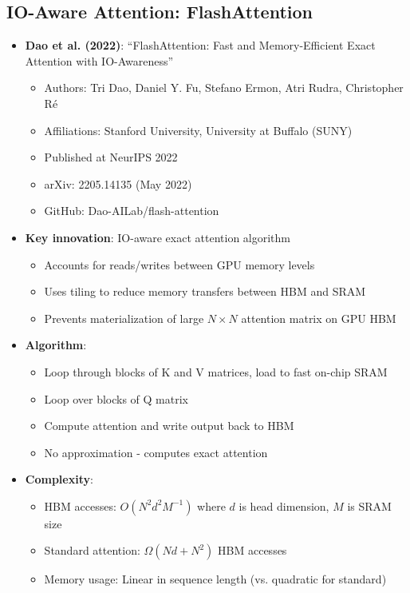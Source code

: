 \documentclass[11pt,letterpaper]{article}
\begin{document}
\subsection{IO-Aware Attention: FlashAttention}

\begin{itemize}[leftmargin=*]
    \item \textbf{Dao et al. (2022)}: ``FlashAttention: Fast and Memory-Efficient Exact Attention with IO-Awareness''
    \begin{itemize}
        \item Authors: Tri Dao, Daniel Y. Fu, Stefano Ermon, Atri Rudra, Christopher Ré
        \item Affiliations: Stanford University, University at Buffalo (SUNY)
        \item Published at NeurIPS 2022
        \item arXiv: 2205.14135 (May 2022)
        \item GitHub: Dao-AILab/flash-attention
    \end{itemize}

    \item \textbf{Key innovation}: IO-aware exact attention algorithm
    \begin{itemize}
        \item Accounts for reads/writes between GPU memory levels
        \item Uses tiling to reduce memory transfers between HBM and SRAM
        \item Prevents materialization of large $N \times N$ attention matrix on GPU HBM
    \end{itemize}

    \item \textbf{Algorithm}:
    \begin{itemize}
        \item Loop through blocks of K and V matrices, load to fast on-chip SRAM
        \item Loop over blocks of Q matrix
        \item Compute attention and write output back to HBM
        \item No approximation - computes exact attention
    \end{itemize}

    \item \textbf{Complexity}:
    \begin{itemize}
        \item HBM accesses: $O(N^2 d^2 M^{-1})$ where $d$ is head dimension, $M$ is SRAM size
        \item Standard attention: $\Omega(Nd + N^2)$ HBM accesses
        \item Memory usage: Linear in sequence length (vs. quadratic for standard)
    \end{itemize}


\end{itemize}
\end{document}
